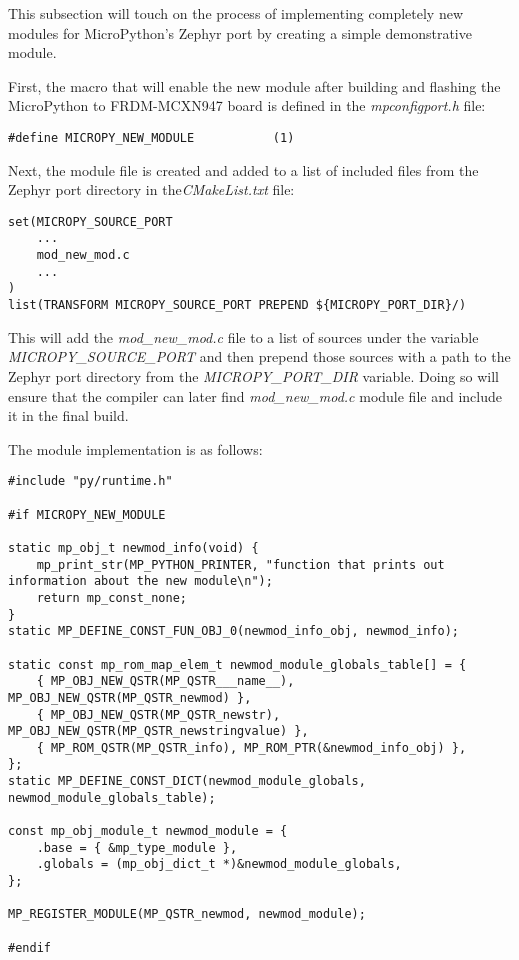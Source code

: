 \documentclass[twoside, 12pt]{article}
\begin{document}
This subsection will touch on the process of implementing completely new modules for
MicroPython's Zephyr port by creating a simple demonstrative module.

First, the macro that will enable the new module after building and flashing the MicroPython 
to FRDM-MCXN947 board is defined in the \textit{mpconfigport.h} file:
\begin{lstlisting}[caption={Implementing a new module for the Zephyr port, Part 1},breaklines=true]
#define MICROPY_NEW_MODULE           (1)
\end{lstlisting}

Next, the module file is created and added to a list of included files from the Zephyr port 
directory in the\textit{CMakeList.txt} file:
\begin{lstlisting}[caption={Implementing a new module for the Zephyr port, Part 2},breaklines=true]
set(MICROPY_SOURCE_PORT
    ...
    mod_new_mod.c
    ...
)
list(TRANSFORM MICROPY_SOURCE_PORT PREPEND ${MICROPY_PORT_DIR}/)  
\end{lstlisting}
This will add the \textit{mod\_new\_mod.c} file to a list of sources under the variable 
\textit{MICROPY\_SOURCE\_PORT} and then prepend those sources with a path to the Zephyr port 
directory from the \textit{MICROPY\_PORT\_DIR} variable. Doing so will ensure that the 
compiler can later find \textit{mod\_new\_mod.c} module file and include it in the final 
build.\cite{swidzinski_cmake}

The module implementation is as follows:
\begin{lstlisting}[caption={Implementing a new module for the Zephyr port, Part 3},breaklines=true]
#include "py/runtime.h"

#if MICROPY_NEW_MODULE

static mp_obj_t newmod_info(void) {
    mp_print_str(MP_PYTHON_PRINTER, "function that prints out information about the new module\n");
    return mp_const_none;
}
static MP_DEFINE_CONST_FUN_OBJ_0(newmod_info_obj, newmod_info);

static const mp_rom_map_elem_t newmod_module_globals_table[] = {
    { MP_OBJ_NEW_QSTR(MP_QSTR___name__), MP_OBJ_NEW_QSTR(MP_QSTR_newmod) },
    { MP_OBJ_NEW_QSTR(MP_QSTR_newstr), MP_OBJ_NEW_QSTR(MP_QSTR_newstringvalue) },
    { MP_ROM_QSTR(MP_QSTR_info), MP_ROM_PTR(&newmod_info_obj) },
};
static MP_DEFINE_CONST_DICT(newmod_module_globals, newmod_module_globals_table);

const mp_obj_module_t newmod_module = {
    .base = { &mp_type_module },
    .globals = (mp_obj_dict_t *)&newmod_module_globals,
};

MP_REGISTER_MODULE(MP_QSTR_newmod, newmod_module);

#endif
\end{lstlisting}
\end{document}
